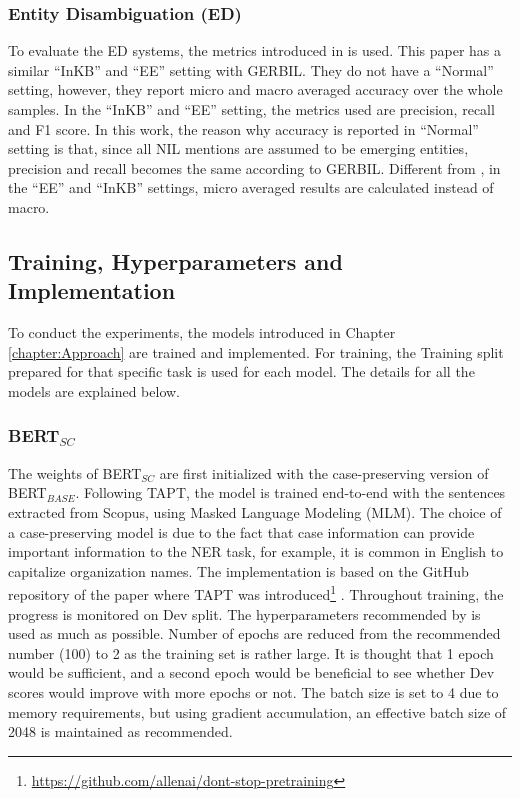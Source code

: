 \documentclass{report}
\theoremstyle{definition}
\theoremstyle{remark}
\begin{document}
\subsubsection{Entity Disambiguation (ED)}
To evaluate the ED systems, the metrics introduced in \cite{NILMentions} is used. This paper has a similar ``InKB'' and ``EE'' setting with GERBIL. They do not have a ``Normal'' setting, however, they report micro and macro averaged accuracy over the whole samples. In the ``InKB'' and ``EE'' setting, the metrics used are precision, recall and F1 score. In this work, the reason why accuracy is reported in ``Normal'' setting is that, since all NIL mentions are assumed to be emerging entities, precision and recall becomes the same according to GERBIL. Different from \cite{NILMentions}, in the ``EE'' and ``InKB'' settings, micro averaged results are calculated instead of macro. 


\subsection{Training, Hyperparameters and Implementation}
\label{sec:EvalExpSetupTraining}
To conduct the experiments, the models introduced in Chapter \ref{chapter:Approach} are trained and implemented. For training, the Training split prepared for that specific task is used for each model. The details for all the models are explained below.
\subsubsection{BERT$_{SC}$}
The weights of BERT$_{SC}$ are first initialized with the case-preserving version of BERT$_{BASE}$. Following TAPT, the model is trained end-to-end with the sentences extracted from Scopus, using Masked Language Modeling (MLM). The choice of a case-preserving model is due to the fact that case information can provide important information to the NER task, for example, it is common in English to capitalize organization names. The implementation is based on the GitHub repository of the paper where TAPT was introduced\footnote{\url{https://github.com/allenai/dont-stop-pretraining}} \cite{DontStop}. Throughout training, the progress is monitored on Dev split. The hyperparameters recommended by \cite{DontStop} is used as much as possible. Number of epochs are reduced from the recommended number (100) to 2 as the training set is rather large. It is thought that 1 epoch would be sufficient, and a second epoch would be beneficial to see whether Dev scores would improve with more epochs or not. The batch size is set to 4 due to memory requirements, but using gradient accumulation, an effective batch size of 2048 is maintained as recommended. 
\end{document}
